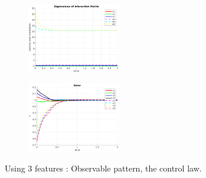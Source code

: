 \documentclass[a4paper,12pt]{article}
\begin{document}
\begin{figure}[tb!]
         \begin{subfigure}[b]{0.2\textwidth}
                \centering
                \includegraphics[height=1.2in]{../results/Demo2-eignen.png}
                 \end{subfigure}%
         \begin{subfigure}[b]{0.32\textwidth}
                \centering
                \includegraphics[height=1.2in]{../results/Demo2-error.png}
                 \end{subfigure}%
         \caption{Using 3 features : Observable pattern, the control law.}
        \label{fig:demo2}
\end{figure}
\end{document}
